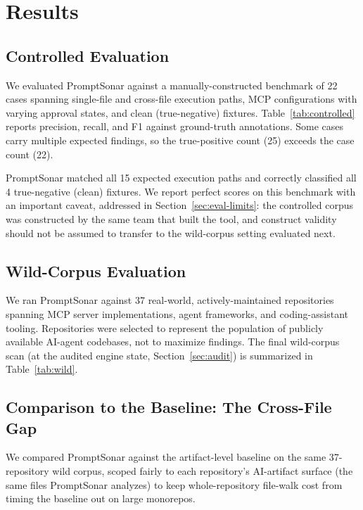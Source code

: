 \documentclass[sigconf,anonymous,review]{acmart}
\newcommand{\sysname}{PromptSonar}
\begin{document}
\section{Results}
\label{sec:results}

\subsection{Controlled Evaluation}
\label{sec:controlled-eval}
We evaluated \sysname{} against a manually-constructed benchmark of 22 cases spanning single-file and cross-file execution paths, MCP configurations with varying approval states, and clean (true-negative) fixtures. Table~\ref{tab:controlled} reports precision, recall, and F1 against ground-truth annotations. Some cases carry multiple expected findings, so the true-positive count (25) exceeds the case count (22).



\sysname{} matched all 15 expected execution paths and correctly classified all 4 true-negative (clean) fixtures. We report perfect scores on this benchmark with an important caveat, addressed in Section~\ref{sec:eval-limits}: the controlled corpus was constructed by the same team that built the tool, and construct validity should not be assumed to transfer to the wild-corpus setting evaluated next.

\subsection{Wild-Corpus Evaluation}
\label{sec:wild-eval}
We ran \sysname{} against 37 real-world, actively-maintained repositories spanning MCP server implementations, agent frameworks, and coding-assistant tooling. Repositories were selected to represent the population of publicly available AI-agent codebases, not to maximize findings. The final wild-corpus scan (at the audited engine state, Section~\ref{sec:audit}) is summarized in Table~\ref{tab:wild}.



\subsection{Comparison to the Baseline: The Cross-File Gap}
\label{sec:crossfile}
We compared \sysname{} against the artifact-level baseline on the same 37-repository wild corpus, scoped fairly to each repository's AI-artifact surface (the same files \sysname{} analyzes) to keep whole-repository file-walk cost from timing the baseline out on large monorepos.
\end{document}
